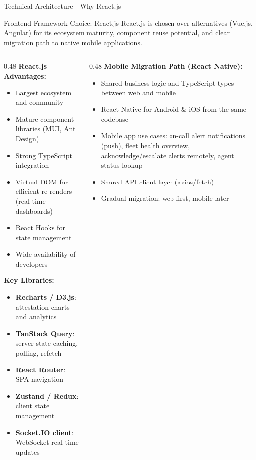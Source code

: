 \begin{frame}{Technical Architecture - Why React.js}
  \begin{block}{Frontend Framework Choice: React.js}
    \scriptsize
    React.js is chosen over alternatives (Vue.js, Angular) for its ecosystem maturity,
    component reuse potential, and clear migration path to native mobile applications.
  \end{block}

  \vspace{0.05cm}

  \tiny
  \begin{columns}[T]
    \begin{column}{0.48\textwidth}
      \textbf{React.js Advantages:}
      \begin{itemize}
        \setlength{\itemsep}{0pt}
        \item Largest ecosystem and community
        \item Mature component libraries (MUI, Ant Design)
        \item Strong TypeScript integration
        \item Virtual DOM for efficient re-renders (real-time dashboards)
        \item React Hooks for state management
        \item Wide availability of developers
      \end{itemize}

      \vspace{0.05cm}

      \textbf{Key Libraries:}
      \begin{itemize}
        \setlength{\itemsep}{0pt}
        \item \textbf{Recharts / D3.js}: attestation charts and analytics
        \item \textbf{TanStack Query}: server state caching, polling, refetch
        \item \textbf{React Router}: SPA navigation
        \item \textbf{Zustand / Redux}: client state management
        \item \textbf{Socket.IO client}: WebSocket real-time updates
      \end{itemize}
    \end{column}
    \begin{column}{0.48\textwidth}
      \textbf{Mobile Migration Path (React Native):}
      \begin{itemize}
        \setlength{\itemsep}{0pt}
        \item Shared business logic and TypeScript types between web and mobile
        \item React Native for Android \& iOS from the same codebase
        \item Mobile app use cases: on-call alert notifications (push), fleet health overview, acknowledge/escalate alerts remotely, agent status lookup
        \item Shared API client layer (axios/fetch)
        \item Gradual migration: web-first, mobile later
      \end{itemize}


\end{column}
\end{columns}
\end{frame}
